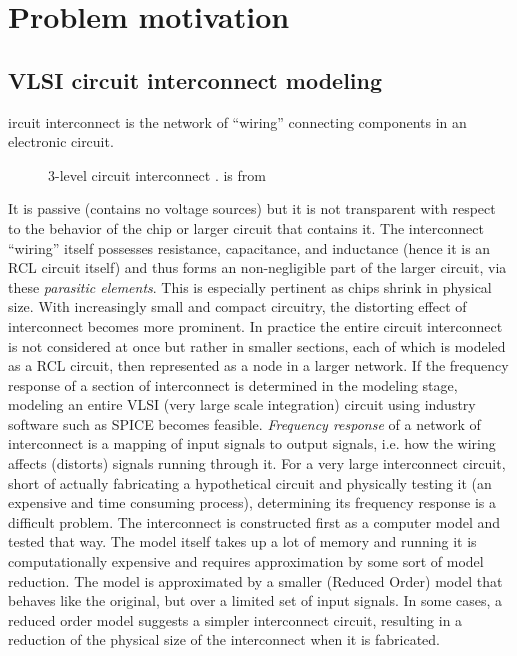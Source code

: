 

\section{Problem motivation}\label{sec:motivation}

\subsection{VLSI circuit interconnect modeling}
ircuit interconnect is the network of ``wiring'' connecting components in an electronic circuit.      
\begin{figure}[tb]
\centering
{}\hfill
{}
\caption{ 3-level circuit interconnect  \cite{wiki:IC}.   is  from \cite{stan1}}
\label{fig:im}
\end{figure}
It is passive (contains no voltage sources) but it is not transparent with respect to the behavior of the chip or larger circuit that contains it.   The interconnect ``wiring'' itself possesses  resistance, capacitance, and inductance (hence it is an RCL circuit itself) and thus forms an  non-negligible part of the larger circuit, via these \emph{parasitic elements}.  This is especially pertinent as chips shrink in physical size. With increasingly small and compact circuitry, the distorting effect of interconnect becomes more prominent.  In practice the entire circuit interconnect is not considered at once but rather in smaller sections, each of which is modeled as a RCL circuit, then represented as a node in a larger network.  If the frequency response of a section of interconnect is determined in the modeling stage, modeling an entire VLSI (very large scale integration) circuit using industry software such as SPICE becomes feasible.    \emph{Frequency response} of a network of interconnect is a mapping of input signals to output signals, i.e. how the wiring affects (distorts) signals running through it.    For a very large interconnect circuit,  short of actually fabricating a hypothetical circuit and physically testing it (an expensive and time consuming process), determining its frequency response is a difficult problem.  The interconnect is constructed first as a computer model and tested that way.  The model itself takes up a lot of memory and running it is computationally expensive and requires approximation by some sort of model reduction.   The model is approximated by a smaller (Reduced Order) model that behaves like the original, but over a limited set of input signals.  In some cases, a reduced order model suggests a simpler interconnect circuit, resulting in a reduction of the physical size of the interconnect when it is fabricated.     

